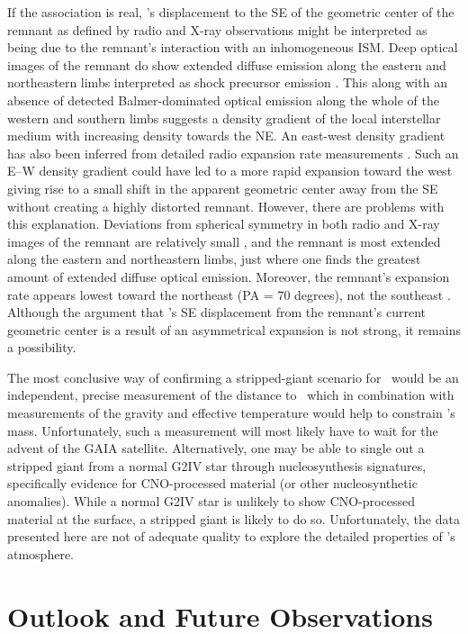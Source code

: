 If the association is real, \starg's displacement to the SE of the geometric
center of the remnant as defined by radio and X-ray observations might
be interpreted as being due to the remnant's interaction with an
inhomogeneous ISM.  Deep optical images of the remnant do show
extended diffuse emission along the eastern and northeastern limbs
interpreted as shock precursor emission
\citep{2000ApJ...535..266G}. This along with an absence of detected
Balmer-dominated optical emission along the whole of the western and
southern limbs suggests a density gradient of the local interstellar
medium with increasing density towards the NE. An east-west density
gradient has also been inferred from detailed radio expansion rate
measurements \citep{1997ApJ...491..816R}.  Such an E--W density
gradient could have led to a more rapid expansion toward the west
giving rise to a small shift in the apparent geometric center away
from the SE without creating a highly distorted remnant.  However, there are problems with this explanation. Deviations from spherical symmetry in both radio and X-ray
images of the remnant are relatively small
\citep{1997ApJ...491..816R,2007ApJ...665..315C}, and the remnant is
most extended along the eastern and northeastern limbs, just where one
finds the greatest amount of extended diffuse optical
emission.
Moreover, the remnant's expansion rate appears lowest toward
the northeast (PA = 70 degrees), not the southeast \citep{1997ApJ...491..816R}. Although the
argument that \starg's SE displacement from the remnant's current
geometric center is a result of an asymmetrical expansion is not
strong, it remains a possibility.

The most conclusive way of confirming a stripped-giant scenario for
\starg\ would be an independent, precise measurement of the distance
to \starg\ which in combination with measurements of the gravity and
effective temperature would help to constrain \starg's
mass. Unfortunately, such a measurement will most likely have to wait
for the advent of the GAIA satellite.  Alternatively, one may be able
to single out a stripped giant from a normal G2IV star through
nucleosynthesis signatures, specifically evidence for CNO-processed
material (or other nucleosynthetic anomalies).  While a normal G2IV star is unlikely to show CNO-processed
material at the surface, a stripped giant is likely to do so. Unfortunately, the data presented here are not of adequate quality to explore the detailed properties of \starg's atmosphere.

\section{Outlook and Future Observations}

